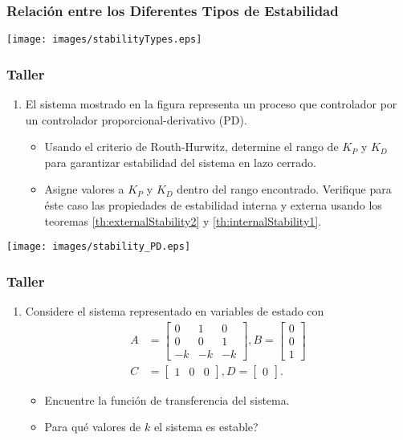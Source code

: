 \documentclass[aspectratio=169,handout]{beamer}
\theoremstyle{definition}
\theoremstyle{plain}
\theoremstyle{remark}
\newcounter{saveenumi}
\newcommand{\seti}{\setcounter{saveenumi}{\value{enumi}}}
\newcommand{\conti}{\setcounter{enumi}{\value{saveenumi}}}
\begin{document}
\begin{frame}[<-+>]\frametitle{Relación entre los Diferentes Tipos de Estabilidad}
\centering
\vspace*{5mm}
\texttt{[image: images/stabilityTypes.eps]}
\end{frame}

\begin{frame}\frametitle{Taller}
\begin{enumerate}
  \conti
  \item El sistema mostrado en la figura representa un proceso que controlador por un controlador proporcional-derivativo (PD).
  \begin{itemize}
  	\item Usando el criterio de Routh-Hurwitz, determine el rango de $K_P$ y $K_D$ para garantizar estabilidad del sistema en lazo cerrado.
  	\item Asigne valores a $K_P$ y $K_D$ dentro del rango encontrado. Verifique para éste caso las propiedades de estabilidad interna y externa usando los teoremas \ref{th:externalStability2} y \ref{th:internalStability1}.
  \end{itemize}
  \seti
\end{enumerate}
\begin{center}
  \texttt{[image: images/stability\_PD.eps]}
\end{center}
\end{frame}

\begin{frame}\frametitle{Taller}
\begin{enumerate}
  \conti
  \item Considere el sistema representado en variables de estado con
  \begin{align*}
  	A &= 
  	\begin{bmatrix}
  		0  &  1 &  0\\
  		0  &  0 &  1\\
  		-k & -k & -k
  	\end{bmatrix},
  	B = 
  	\begin{bmatrix}
  		0 \\ 0 \\ 1
  	\end{bmatrix}\\
  	C &=
  	\begin{bmatrix}
  		1 & 0 & 0
  	\end{bmatrix}, 
  	D =
  	\begin{bmatrix}
  		0
  	\end{bmatrix}.
  \end{align*}
  \begin{itemize}
  	\item Encuentre la función de transferencia del sistema.
  	\item Para qué valores de $k$ el sistema es estable?
  \end{itemize}
  \seti
\end{enumerate}
\end{frame}
\end{document}
